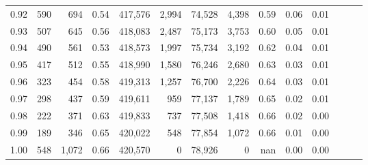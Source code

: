 \begin{tabular}{rrrrrrrrrrrrrr}
0.92 &    590 &    694 &  0.54 &  417,576 &    2,994 &  74,528 &   4,398 &  0.59 &  0.06 &      0.01 \\
0.93 &    507 &    645 &  0.56 &  418,083 &    2,487 &  75,173 &   3,753 &  0.60 &  0.05 &      0.01 \\
0.94 &    490 &    561 &  0.53 &  418,573 &    1,997 &  75,734 &   3,192 &  0.62 &  0.04 &      0.01 \\
0.95 &    417 &    512 &  0.55 &  418,990 &    1,580 &  76,246 &   2,680 &  0.63 &  0.03 &      0.01 \\
0.96 &    323 &    454 &  0.58 &  419,313 &    1,257 &  76,700 &   2,226 &  0.64 &  0.03 &      0.01 \\
0.97 &    298 &    437 &  0.59 &  419,611 &      959 &  77,137 &   1,789 &  0.65 &  0.02 &      0.01 \\
0.98 &    222 &    371 &  0.63 &  419,833 &      737 &  77,508 &   1,418 &  0.66 &  0.02 &      0.00 \\
0.99 &    189 &    346 &  0.65 &  420,022 &      548 &  77,854 &   1,072 &  0.66 &  0.01 &      0.00 \\
1.00 &    548 &  1,072 &  0.66 &  420,570 &        0 &  78,926 &       0 &   nan &  0.00 &      0.00 \\
\bottomrule
\end{tabular}
